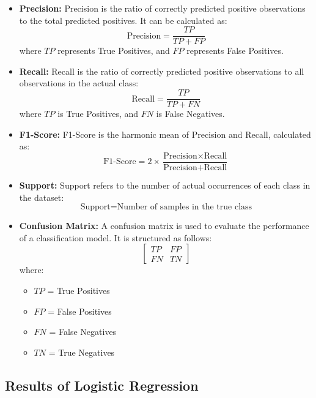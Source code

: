 \begin{itemize}
    \item \textbf{Precision:} Precision is the ratio of correctly predicted positive observations to the total predicted positives. It can be calculated as:
    \[
    \text{Precision} = \frac{TP}{TP + FP}
    \]
    where \( TP \) represents True Positives, and \( FP \) represents False Positives.

    \item \textbf{Recall:} Recall is the ratio of correctly predicted positive observations to all observations in the actual class:
    \[
    \text{Recall} = \frac{TP}{TP + FN}
    \]
    where \( TP \) is True Positives, and \( FN \) is False Negatives.

    \item \textbf{F1-Score:} F1-Score is the harmonic mean of Precision and Recall, calculated as:
    \[
    \text{F1-Score} = 2 \times \frac{\text{Precision} \times \text{Recall}}{\text{Precision} + \text{Recall}}
    \]

    \item \textbf{Support:} Support refers to the number of actual occurrences of each class in the dataset:
    \[
    \text{Support} = \text{Number of samples in the true class}
    \]

    \item \textbf{Confusion Matrix:} A confusion matrix is used to evaluate the performance of a classification model. It is structured as follows:
    \[
    \begin{bmatrix}
    TP & FP \\
    FN & TN
    \end{bmatrix}
    \]
    where:
    \begin{itemize}
        \item \( TP \) = True Positives
        \item \( FP \) = False Positives
        \item \( FN \) = False Negatives
        \item \( TN \) = True Negatives
    \end{itemize}
\end{itemize}

\subsection{Results of Logistic Regression}

